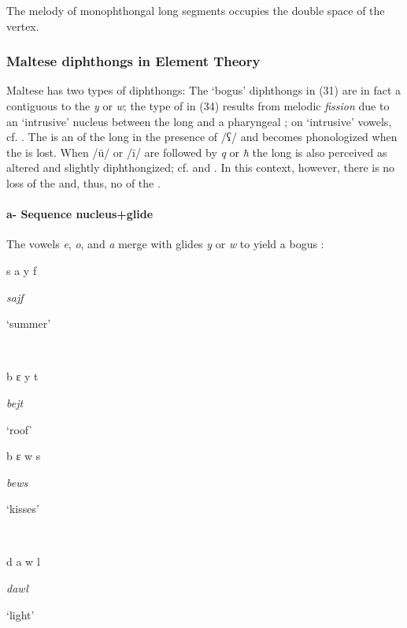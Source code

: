 \documentclass[output=paper]{langsci/langscibook}
\begin{document}



The melody of monophthongal long segments occupies the double space of the vertex.

\subsubsection{Maltese diphthongs in Element Theory}
Maltese has two types of diphthongs: The ‘bogus’ diphthongs in (31) are in fact a  contiguous to the  \textit{y} or \textit{w}; the type of  in (34) results from melodic \textit{fission} due to an ‘intrusive’ nucleus between the long  and a pharyngeal ; on ‘intrusive’ vowels, cf. \citet{Hall2006}. The  is an  of the long  in the presence of /ʕ/ and becomes phonologized when the  is lost. When /ū/ or /ī/ are followed by \textit{q} or \textit{ħ} the long  is also perceived as altered and slightly diphthongized; cf. \citet[38, 54]{Aquilina1959} and \citet[304, 305]{BorgAzzopardi1997}. In this context, however, there is no loss of the  and, thus, no  of the .

\paragraph{a- Sequence  nucleus+glide}
\ea
The vowels \textit{e}, \textit{o}, and \textit{a} merge with glides \textit{y} or \textit{w} to yield a bogus :

\ea%
\parbox{2cm}{s  a  y  f}\parbox{1.5cm}{\textit{sajf}}\parbox{2cm}{‘summer’}\\
\parbox{2cm}{b  ɛ  y  t}\parbox{1.5cm}{\textit{bejt}}\parbox{2cm}{‘roof’}
\ex%
\parbox{2cm}{b  ɛ  w  s}\parbox{1.5cm}{\textit{bews}}\parbox{2cm}{  ‘kisses’}\\
\parbox{2cm}{d  a  w  l}\parbox{1.5cm}{\textit{dawl}}\parbox{2cm}{‘light’}
\z
\z
\end{document}

